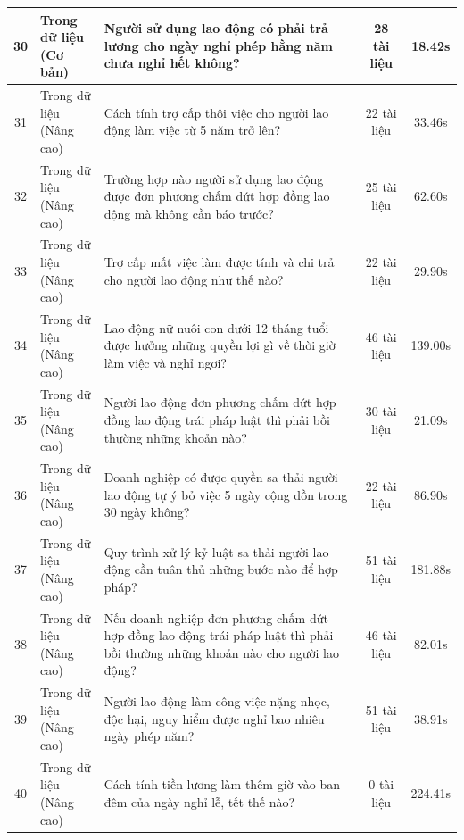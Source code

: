 \begin{longtable}{|c|l|p{6.5cm}|c|c|}
30 & \makecell[l]{Trong dữ liệu\\(Cơ bản)} & Người sử dụng lao động có phải trả lương cho ngày nghỉ phép hằng năm chưa nghỉ hết không? & 28 tài liệu & 18.42s \\ \hline
31 & \makecell[l]{Trong dữ liệu\\(Nâng cao)} & Cách tính trợ cấp thôi việc cho người lao động làm việc từ 5 năm trở lên? & 22 tài liệu & 33.46s \\ \hline
32 & \makecell[l]{Trong dữ liệu\\(Nâng cao)} & Trường hợp nào người sử dụng lao động được đơn phương chấm dứt hợp đồng lao động mà không cần báo trước? & 25 tài liệu & 62.60s \\ \hline
33 & \makecell[l]{Trong dữ liệu\\(Nâng cao)} & Trợ cấp mất việc làm được tính và chi trả cho người lao động như thế nào? & 22 tài liệu & 29.90s \\ \hline
34 & \makecell[l]{Trong dữ liệu\\(Nâng cao)} & Lao động nữ nuôi con dưới 12 tháng tuổi được hưởng những quyền lợi gì về thời giờ làm việc và nghỉ ngơi? & 46 tài liệu & 139.00s \\ \hline
35 & \makecell[l]{Trong dữ liệu\\(Nâng cao)} & Người lao động đơn phương chấm dứt hợp đồng lao động trái pháp luật thì phải bồi thường những khoản nào? & 30 tài liệu & 21.09s \\ \hline
36 & \makecell[l]{Trong dữ liệu\\(Nâng cao)} & Doanh nghiệp có được quyền sa thải người lao động tự ý bỏ việc 5 ngày cộng dồn trong 30 ngày không? & 22 tài liệu & 86.90s \\ \hline
37 & \makecell[l]{Trong dữ liệu\\(Nâng cao)} & Quy trình xử lý kỷ luật sa thải người lao động cần tuân thủ những bước nào để hợp pháp? & 51 tài liệu & 181.88s \\ \hline
38 & \makecell[l]{Trong dữ liệu\\(Nâng cao)} & Nếu doanh nghiệp đơn phương chấm dứt hợp đồng lao động trái pháp luật thì phải bồi thường những khoản nào cho người lao động? & 46 tài liệu & 82.01s \\ \hline
39 & \makecell[l]{Trong dữ liệu\\(Nâng cao)} & Người lao động làm công việc nặng nhọc, độc hại, nguy hiểm được nghỉ bao nhiêu ngày phép năm? & 51 tài liệu & 38.91s \\ \hline
40 & \makecell[l]{Trong dữ liệu\\(Nâng cao)} & Cách tính tiền lương làm thêm giờ vào ban đêm của ngày nghỉ lễ, tết thế nào? & 0 tài liệu & 224.41s \\ \hline

\end{longtable}
